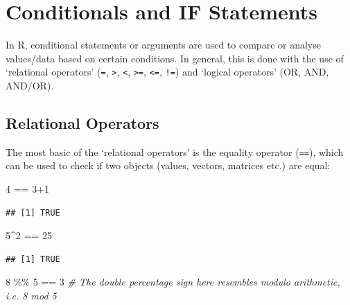 \documentclass[
]{book}
\newenvironment{Shaded}{\begin{snugshade}}{\end{snugshade}}
\newcommand{\CommentTok}[1]{\textcolor[rgb]{0.56,0.35,0.01}{\textit{#1}}}
\newcommand{\DecValTok}[1]{\textcolor[rgb]{0.00,0.00,0.81}{#1}}
\newcommand{\SpecialCharTok}[1]{\textcolor[rgb]{0.00,0.00,0.00}{#1}}
\theoremstyle{definition}
\theoremstyle{definition}
\theoremstyle{definition}
\theoremstyle{definition}
\theoremstyle{remark}
\begin{document}
\hypertarget{conditionals-and-if-statements}{%
\chapter{Conditionals and IF Statements}\label{conditionals-and-if-statements}}

In R, conditional statements or arguments are used to compare or analyse values/data based on certain conditions. In general, this is done with the use of `relational operators' (\texttt{=}, \texttt{\textgreater{}}, \texttt{\textless{}}, \texttt{\textgreater{}=}, \texttt{\textless{}=}, \texttt{!=}) and `logical operators' (OR, AND, AND/OR).

\hypertarget{relational-operators}{%
\section{Relational Operators}\label{relational-operators}}

The most basic of the `relational operators' is the equality operator (\texttt{==}), which can be used to check if two objects (values, vectors, matrices etc.) are equal:

\begin{Shaded}
\begin{Highlighting}[]
\DecValTok{4} \SpecialCharTok{==} \DecValTok{3}\SpecialCharTok{+}\DecValTok{1}
\end{Highlighting}
\end{Shaded}

\begin{verbatim}
## [1] TRUE
\end{verbatim}

\begin{Shaded}
\begin{Highlighting}[]
\DecValTok{5}\SpecialCharTok{\^{}}\DecValTok{2} \SpecialCharTok{==} \DecValTok{25}
\end{Highlighting}
\end{Shaded}

\begin{verbatim}
## [1] TRUE
\end{verbatim}

\begin{Shaded}
\begin{Highlighting}[]
\DecValTok{8} \SpecialCharTok{\%\%} \DecValTok{5} \SpecialCharTok{==} \DecValTok{3}  \CommentTok{\# The double percentage sign here resembles modulo arithmetic, i.e. 8 mod 5}
\end{Highlighting}
\end{Shaded}
\end{document}
